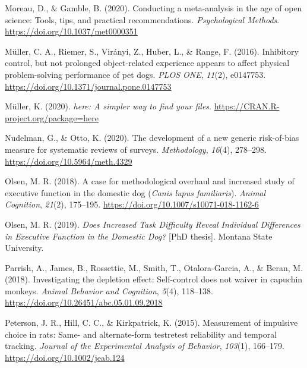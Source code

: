 \documentclass[
  ,pub,floatsintext]{apa6}
\newlength{\cslhangindent}
\newlength{\cslentryspacingunit} %
\newenvironment{CSLReferences}[2] %
 {%
  \setlength{\parindent}{0pt}
  \ifodd #1
  \let\oldpar\par
  \def\par{\hangindent=\cslhangindent\oldpar}
  \fi
  \setlength{\parskip}{#2\cslentryspacingunit}
 }%
 {}
\begin{document}
\begin{CSLReferences}{1}{0}
\leavevmode{}%
Moreau, D., \& Gamble, B. (2020). Conducting a meta-analysis in the age of open science: {Tools}, tips, and practical recommendations. \emph{Psychological Methods}. \url{https://doi.org/10.1037/met0000351}

\leavevmode{}%
Müller, C. A., Riemer, S., Virányi, Z., Huber, L., \& Range, F. (2016). Inhibitory control, but not prolonged object-related experience appears to affect physical problem-solving performance of pet dogs. \emph{PLOS ONE}, \emph{11}(2), e0147753. \url{https://doi.org/10.1371/journal.pone.0147753}

\leavevmode{}%
Müller, K. (2020). \emph{{here}: A simpler way to find your files}. \url{https://CRAN.R-project.org/package=here}

\leavevmode{}%
Nudelman, G., \& Otto, K. (2020). The development of a new generic risk-of-bias measure for systematic reviews of surveys. \emph{Methodology}, \emph{16}(4), 278--298. \url{https://doi.org/10.5964/meth.4329}

\leavevmode{}%
Olsen, M. R. (2018). A case for methodological overhaul and increased study of executive function in the domestic dog ({\emph{Canis}}{ \emph{lupus familiaris}}). \emph{Animal Cognition}, \emph{21}(2), 175--195. \url{https://doi.org/10.1007/s10071-018-1162-6}

\leavevmode{}%
Olsen, M. R. (2019). \emph{Does {Increased Task Difficulty Reveal Individual Differences} in {Executive Function} in the {Domestic Dog}?} {[}PhD thesis{]}. Montana State University.

\leavevmode{}%
Parrish, A., James, B., Rossettie, M., Smith, T., Otalora-Garcia, A., \& Beran, M. (2018). Investigating the depletion effect: {Self-control} does not waiver in capuchin monkeys. \emph{Animal Behavior and Cognition}, \emph{5}(4), 118--138. \url{https://doi.org/10.26451/abc.05.01.09.2018}

\leavevmode{}%
Peterson, J. R., Hill, C. C., \& Kirkpatrick, K. (2015). Measurement of impulsive choice in rats: Same- and alternate-form test\textendash retest reliability and temporal tracking. \emph{Journal of the Experimental Analysis of Behavior}, \emph{103}(1), 166--179. \url{https://doi.org/10.1002/jeab.124}


\end{CSLReferences}
\end{document}
